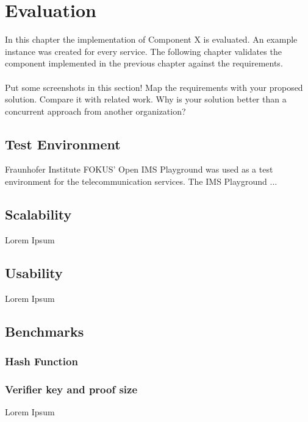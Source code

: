 \chapter{Evaluation\label{cha:chapter6}}

In this chapter the implementation of Component X is evaluated. An example instance was created for every service. The following chapter validates the component implemented in the previous chapter against the requirements.
\\
\\
Put some screenshots in this section! Map the requirements with your proposed solution. Compare it with related work. Why is your solution better than a concurrent approach from another organization?

\section{Test Environment\label{sec:testenvir}}

Fraunhofer Institute FOKUS' Open IMS Playground was used as a test environment for the telecommunication services. The IMS Playground ...

\section{Scalability\label{sec:scal}}

Lorem Ipsum

\section{Usability\label{sec:usab}}

Lorem Ipsum

\section{Benchmarks\label{sec:benchmarks}}

\subsection{Hash Function\label{subsec:6_hashfunc}}

\subsection{Verifier key and proof size\label{subsec:6_verifierproofsize}}

Lorem Ipsum
